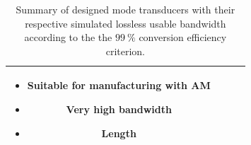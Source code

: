 \documentclass[english,twoside]{article}
\newcommand\pro{\item[$+$]}
\newcommand\con{\item[$-$]}
\begin{document}
\begin{landscape}
\begin{table}[H]
{\begin{tabular}{c|l|c|l}
						\begin{minipage}{5cm} 
							\begin{itemize}
								\pro Suitable for manufacturing with AM
								\pro Very high bandwidth
								\con Length
							\end{itemize}
						\end{minipage}\\
						\hline						
					\end{tabular}
				}			
				\caption{Summary of designed mode transducers with their respective simulated lossless usable bandwidth according to the the $\SI{99}{\percent}$ conversion efficiency criterion.}
			\end{table}
		\end{landscape}
    
    
	
\end{document}
